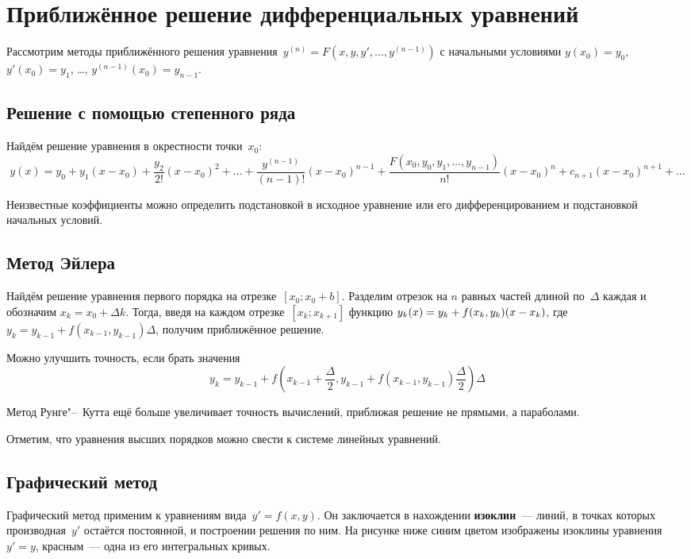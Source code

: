 \section{Приближённое решение дифференциальных уравнений}
Рассмотрим методы приближённого решения уравнения~$y^{(n)} = F(x, y, y', \ldots, y^{(n-1)})$ с начальными условиями $y(x_0) = y_0$, $y'(x_0) = y_1$, \ldots, $y^{(n-1)}(x_0) = y_{n-1}$.

\subsection{Решение с помощью степенного ряда}
Найдём решение уравнения в окрестности точки~$x_0$:
\begin{equation*}
y(x) = y_0 + y_1(x - x_0) + \frac{y_2}{2!} (x - x_0)^2 + \ldots + \frac{y^{(n-1)}}{(n - 1)!} (x - x_0)^{n-1} + \frac{F(x_0, y_0, y_1, \ldots, y_{n-1})}{n!} (x - x_0)^n + c_{n+1} (x - x_0)^{n+1} + \ldots
\end{equation*}

Неизвестные коэффициенты можно определить подстановкой в исходное уравнение или его дифференцированием и подстановкой начальных условий.

\subsection{Метод Эйлера}
 Найдём решение уравнения первого порядка на отрезке~$[x_0; x_0 + b]$.
Разделим отрезок на $n$ равных частей длиной по~$\Delta$ каждая и обозначим $x_k = x_0 + \Delta k$.
Тогда, введя на каждом отрезке~$[x_k; x_{k+1}]$ функцию $y_k(x) = y_k + f(x_k, y_k) \* (x - x_k)$, где $y_k = y_{k-1} + f(x_{k-1}, y_{k-1}) \Delta$, получим приближённое решение.

Можно улучшить точность, если брать значения
\begin{equation*}
y_k = y_{k-1} + f \left(x_{k-1} + \frac\Delta2, y_{k-1} + f(x_{k-1}, y_{k-1}) \frac\Delta2\right) \Delta
\end{equation*}

 Метод Рунге"--~Кутта ещё больше увеличивает точность вычислений, приближая решение не прямыми, а параболами.

Отметим, что уравнения высших порядков можно свести к системе линейных уравнений.

\subsection{Графический метод}
 Графический метод применим к уравнениям вида~$y' = f(x, y)$.
 Он заключается в нахождении \textbf{изоклин}~--- линий, в точках которых производная~$y'$ остаётся постоянной, и построении решения по ним.
На рисунке ниже синим цветом изображены изоклины уравнения $y' = y$, красным~--- одна из его интегральных кривых.

